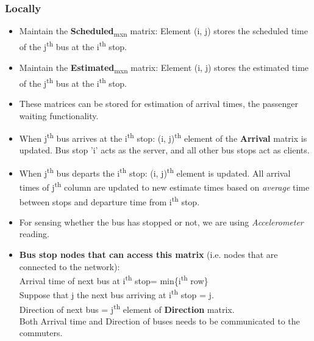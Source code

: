 \subsubsection{Locally}

\begin{itemize}

\item Maintain the \textbf{Scheduled}\textsubscript{mxn} matrix: Element (i, j) stores the scheduled time of the j\textsuperscript{th} bus at the i\textsuperscript{th} stop.
\item Maintain the \textbf{Estimated}\textsubscript{mxn} matrix: Element (i, j) stores the estimated time of the j\textsuperscript{th} bus at the i\textsuperscript{th} stop.
\item These matrices can be stored for estimation of arrival times, the passenger waiting functionality.
\item When j\textsuperscript{th} bus arrives at the i\textsuperscript{th} stop: (i, j)\textsuperscript{th} element of the \textbf{Arrival} matrix is updated. Bus stop 'i' acts as the server, and all other bus stops act as clients.
\item When j\textsuperscript{th} bus departs the i\textsuperscript{th} stop: (i, j)\textsuperscript{th} element is updated. All arrival times of j\textsuperscript{th} column are updated to new estimate times based on \textit{average} time between stops and departure time from i\textsuperscript{th} stop.
\item For sensing whether the bus has stopped or not, we are using \textit{Accelerometer} reading.
\item \textbf{Bus stop nodes that can access this matrix} (i.e. nodes that are connected to the network):\\
\null \qquad Arrival time of next bus at i\textsuperscript{th} stop= min\{i\textsuperscript{th} row\}\\
\null \qquad Suppose that j the next bus arriving at i\textsuperscript{th} stop = j.\\
\null \qquad Direction of next bus = j\textsuperscript{th} element of \textbf{Direction} matrix.\\
\null \qquad Both Arrival time and Direction of buses needs to be communicated to the commuters.


\end{itemize}
